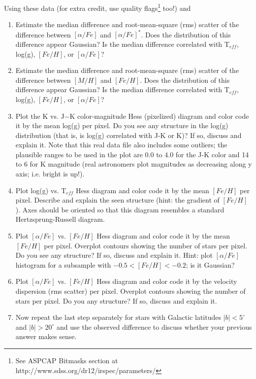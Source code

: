 Using these data (for extra credit, use quality flags\footnote{See ASPCAP Bitmasks section at http://www.sdss.org/dr12/irspec/parameters/} too!) and 
\begin{enumerate}
\item Estimate the median difference and root-mean-square (rms) scatter of the difference between $[\alpha/Fe]$ and $[\alpha/Fe]^\ast$. Does the distribution of this difference appear Gaussian? Is the median difference correlated with T$_{eff}$, log(g), $[Fe/H]$, or $[\alpha/Fe]$? 
\item Estimate the median difference and root-mean-square (rms) scatter of the difference between $[M/H]$ and $[Fe/H]$. 
Does the distribution of this difference appear Gaussian? 
Is the median difference correlated with T$_{eff}$, log(g), $[Fe/H]$, or $[\alpha/Fe]$? 
\item Plot the K vs. J$-$K color-magnitude Hess (pixelized) diagram and color code it by the mean log(g) per pixel.
Do you see any structure in the log(g) distribution (that is, is log(g) correlated with J-K or K)? If so, discuss and explain it. 
Note that this real data file also includes some outliers; the plausible ranges to be used in the plot are 0.0 to 4.0 for 
the J-K color and 14 to 6 for K magnitude (real astronomers plot magnitudes as decreasing along y axis; i.e. bright is up!). 
\item Plot log(g) vs. T$_{eff}$ Hess diagram and color code it by the mean $[Fe/H]$ per pixel.
Describe and explain the seen structure (hint: the gradient of $[Fe/H]$). Axes should be oriented so that 
this diagram resembles a standard Hertzsprung-Russell diagram.  
\item Plot $[\alpha/Fe]$ vs. $[Fe/H]$ Hess diagram and color code it by the mean $[Fe/H]$ per pixel.
Overplot contours showing the number of stars per pixel. Do you see any structure? If so, discuss and explain it. 
Hint: plot $[\alpha/Fe]$ histogram for a subsample with $-0.5 < [Fe/H] < -0.2$; is it Gaussian? 
\item Plot $[\alpha/Fe]$ vs. $[Fe/H]$ Hess diagram and color code it by the velocity dispersion (rms scatter) per pixel.
Overplot contours showing the number of stars per pixel. Do you any structure? If so, discuss and explain it. 
\item Now repeat the last step separately for stars with Galactic latitudes $|b| < 5^\circ$ and $|b| > 20^\circ$ and 
use the observed difference to discuss whether your previous answer makes sense.  
\end{enumerate}


